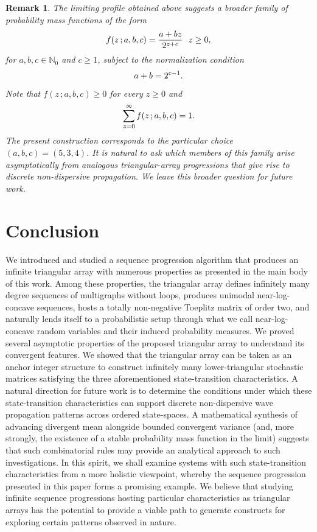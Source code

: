 \documentclass[a4paper,12pt]{article}
\newtheorem{rem}[thm]{Remark}
\def\N{\mathbb{N}}
\begin{document}
\begin{rem}
The limiting profile obtained above suggests a broader family of probability mass functions of the form
\begin{align}
f(z \, ; a,b,c) =\frac{a+bz}{2^{z+c}} \,\,\,\, \text{$z\geq 0$}, \notag
\end{align}
for $a,b,c\in\N_0$ and $c\geq 1$, subject to the normalization condition
\begin{align}
a+b=2^{c-1}. \notag
\end{align}
Note that $f(z \, ; a,b,c) \geq 0$ for every $z\geq 0$ and
\begin{align}
\sum_{z=0}^{\infty} f(z \, ; a,b,c) = 1. \notag
\end{align}
The present construction corresponds to the particular choice $(a,b,c)=(5,3,4)$. It is natural to ask which members of this family arise asymptotically from analogous triangular-array progressions that give rise to discrete non-dispersive propagation. We leave this broader question for future work.
\end{rem}

\section{Conclusion}
We introduced and studied a sequence progression algorithm that produces an infinite triangular array with numerous properties as presented in the main body of this work. Among these properties, the triangular array defines infinitely many degree sequences of multigraphs without loops, produces unimodal near-log-concave sequences, hosts a totally non-negative Toeplitz matrix of order two, and naturally lends itself to a probabilistic setup through what we call near-log-concave random variables and their induced probability measures. We proved several asymptotic properties of the proposed triangular array to understand its convergent features. We showed that the triangular array can be taken as an anchor integer structure to construct infinitely many lower-triangular stochastic matrices satisfying the three aforementioned state-transition characteristics. A natural direction for future work is to determine the conditions under which these state-transition characteristics can support discrete non-dispersive wave propagation patterns across ordered state-spaces. A mathematical synthesis of advancing divergent mean alongside bounded convergent variance (and, more strongly, the existence of a stable probability mass function in the limit) suggests that such combinatorial rules may provide an analytical approach to such investigations. In this spirit, we shall examine systems with such state-transition characteristics from a more holistic viewpoint, whereby the sequence progression presented in this paper forms a promising example. We believe that studying infinite sequence progressions hosting particular characteristics as triangular arrays has the potential to provide a viable path to generate constructs for exploring certain patterns observed in nature.
\end{document}
